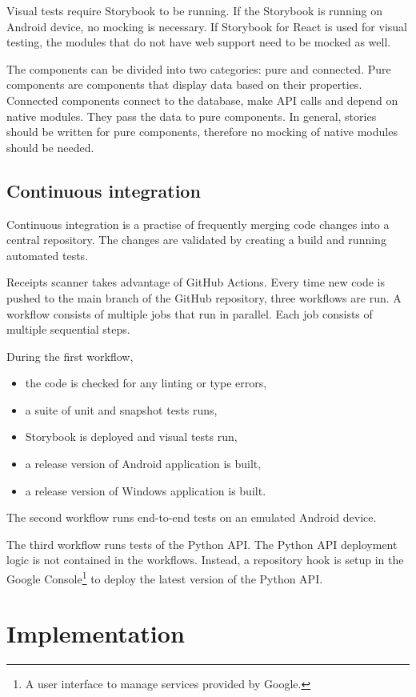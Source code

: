 \documentclass[
  digital, %
  table,   %
  oneside, %
  lof,     %
  lot,     %
]{fithesis3}
\begin{document}
Visual tests require Storybook to be running. If the Storybook is running on Android device, no mocking is necessary. If Storybook for React is used for visual testing, the modules that do not have web support need to be mocked as well.

The components can be divided into two categories: pure and connected. Pure components are components that display data based on their properties. Connected components connect to the database, make API calls and depend on native modules. They pass the data to pure components. In general, stories should be written for pure components, therefore no mocking of native modules should be needed.

\section{Continuous integration}
Continuous integration is a practise of frequently merging code changes into a central repository. The changes are validated by creating a build and running automated tests. \cite{Fowler2006Continuous}

Receipts scanner takes advantage of GitHub Actions. Every time new code is pushed to the main branch of the GitHub repository, three workflows are run. A workflow consists of multiple jobs that run in parallel. Each job consists of multiple sequential steps.

During the first workflow,
\begin{itemize}
    \item the code is checked for any linting or type errors,
    \item a suite of unit and snapshot tests runs,
    \item Storybook is deployed and visual tests run,
    \item a release version of Android application is built,
    \item a release version of Windows application is built.
\end{itemize}

The second workflow runs end-to-end tests on an emulated Android device.

The third workflow runs tests of the Python API. The Python API deployment logic is not contained in the workflows. Instead, a repository hook is setup in the Google Console\footnote{A user interface to manage services provided by Google.} to deploy the latest version of the Python API.

\chapter{Implementation}
\end{document}
